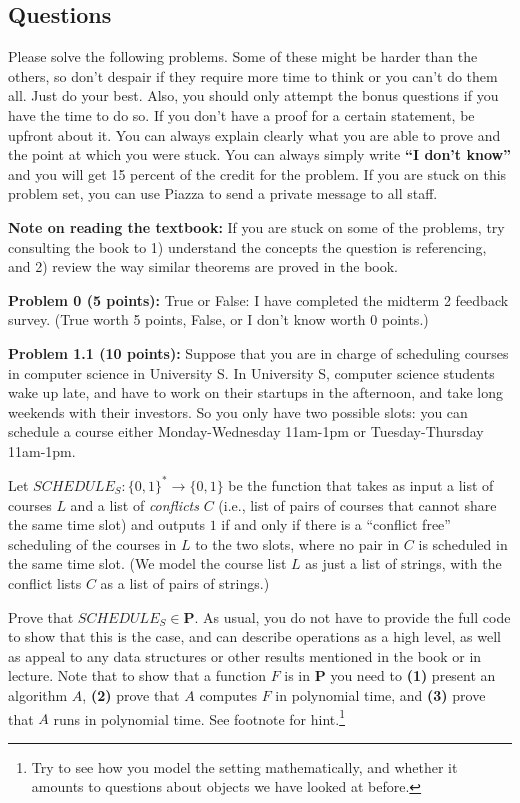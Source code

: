 \documentclass[11pt]{article}
\begin{document}
	\subsection*{Questions}\label{questions}
Please solve the following problems. Some of these might be harder than
the others, so don't despair if they require more time to think or you
can't do them all. Just do your best. Also, you should only attempt the
bonus questions if you have the time to do so. If you don't have a proof
for a certain statement, be upfront about it. You can always explain
clearly what you are able to prove and the point at which you were
stuck. 
You can always simply write
\textbf{``I don't know''} and you will get 15 percent of the credit for
the problem. If you are stuck on this problem set, you can use Piazza to
send a private message to all staff.


\textbf{Note on reading the textbook:} If you are stuck on some of the
problems, try consulting the book to 1) understand the concepts the
question is referencing, and 2) review the way similar theorems are
proved in the book.


\newcommand{\HALT}{\mathrm{HALT}}

\textbf{Problem 0 (5 points):} True or False: I have completed the midterm 2 feedback survey. (True worth 5 points, False, or I don't know worth 0 points.)

\textbf{Problem 1.1 (10 points):} Suppose that you are in charge of
scheduling courses in computer science in University S. In University S,
computer science students wake up late, and have to work on their
startups in the afternoon, and take long weekends with their investors.
So you only have two possible slots: you can schedule a course either
Monday-Wednesday 11am-1pm or Tuesday-Thursday 11am-1pm.

Let \(SCHEDULE_S:\{0,1\}^* \rightarrow \{0,1\}\) be the function that
takes as input a list of courses \(L\) and a list of \emph{conflicts}
\(C\) (i.e., list of pairs of courses that cannot share the same time
slot) and outputs \(1\) if and only if there is a ``conflict free''
scheduling of the courses in \(L\) to the two slots, where no pair in
\(C\) is scheduled in the same time slot. (We model the course list
\(L\) as just a list of strings, with the conflict lists \(C\) as a list
of pairs of strings.)

Prove that \(SCHEDULE_S \in \mathbf{P}\). As usual, you do not have to
provide the full code to show that this is the case, and can describe
operations as a high level, as well as appeal to any data structures or
other results mentioned in the book or in lecture. Note that to show
that a function \(F\) is in \(\mathbf{P}\) you need to \textbf{(1)}
present an algorithm \(A\), 
\textbf{(2)} prove that \(A\) computes \(F\) in polynomial time, and
\textbf{(3)} prove that \(A\) runs in polynomial time. See footnote for hint.\footnote{Try to see how you model the setting
	mathematically, and whether it amounts to questions about objects we
	have looked at before.}
\end{document}
